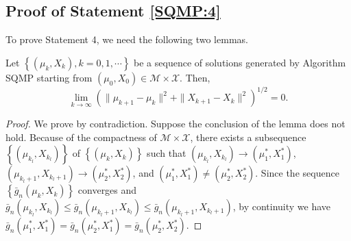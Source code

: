 \subsection{Proof of Statement \ref{SQMP:4}}

To prove Statement 4, we need the following two lemmas.

\begin{lemma}\label{sec:3:prop:2}
Let $\left\{(\mu_k,X_k), k=0,1,\cdots\right\}$ be a sequence of
solutions generated by Algorithm SQMP starting from $(\mu_0,X_0)\in
\mathcal{M}\times \mathcal{X}$. Then, \[\lim_{k\to
\infty}\left(\|\mu_{k+1}-\mu_{k}\|^2+\|X_{k+1}-X_{k}\|^2\right)
^{1/2}=0.\]
\end{lemma}

\begin{proof}
We prove by contradiction. Suppose the conclusion of the lemma does
not hold. Because of the compactness of $\mathcal{M}\times
\mathcal{X}$, there exists a subsequence
$\left\{(\mu_{k_l},X_{k_l})\right\}$ of
$\left\{(\mu_{k},X_{k})\right\}$ such that $(\mu_{k_l},X_{k_l})\to
(\mu_1^*,X_1^*)$, $(\mu_{k_l+1},X_{k_l+1})\to (\mu_2^*,X_2^*)$, and
$(\mu_1^*,X_1^*)\not=(\mu_2^*,X_2^*)$. Since the sequence
$\left\{\bar g_n(\mu_k,X_k)\right\}$ converges and $\bar
g_n(\mu_{k_l},X_{k_l})\le \bar g_n(\mu_{k_l+1},X_{k_l})\le\bar
g_n(\mu_{k_l+1},X_{k_l+1})$, by continuity we have $\bar
g_n(\mu_1^*,X_1^*)=\bar g_n(\mu_2^*,X_1^*)=\bar g_n(\mu_2^*,X_2^*)$.


\end{proof}

